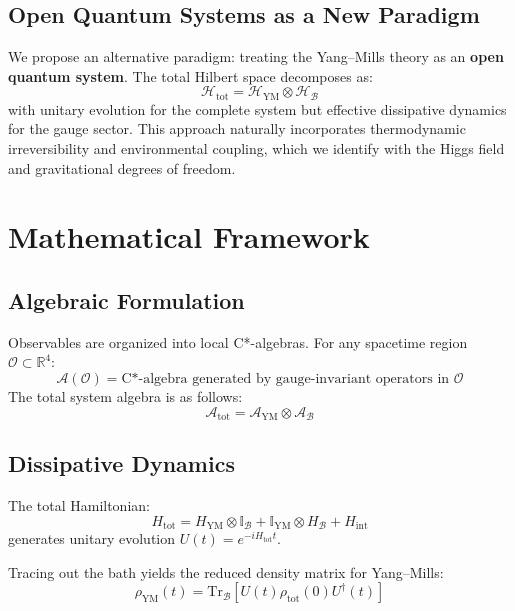\documentclass[aps,prd,reprint,superscriptaddress,floatfix]{revtex4-2}
\newcommand{\bath}{\mathcal{B}}
\newcommand{\YM}{\mathrm{YM}}
\newcommand{\hilb}{\mathscr{H}}
\newcommand{\Traza}{\mathrm{Tr}}
\begin{document}
\subsection{Open Quantum Systems as a New Paradigm}
We propose an alternative paradigm: treating the Yang--Mills theory as an \textbf{open quantum system}. The total Hilbert space decomposes as:
\begin{equation}
\hilb_{\mathrm{tot}} = \hilb_{\YM} \otimes \hilb_{\bath}
\end{equation}
with unitary evolution for the complete system but effective dissipative dynamics for the gauge sector. This approach naturally incorporates thermodynamic irreversibility and environmental coupling, which we identify with the Higgs field and gravitational degrees of freedom.

\section{Mathematical Framework}
\label{sec:math}

\subsection{Algebraic Formulation}
Observables are organized into local C*-algebras. For any spacetime region $\mathcal{O} \subset \mathbb{R}^4$:
\begin{equation}
\mathcal{A}(\mathcal{O}) = \text{C*-algebra generated by gauge-invariant operators in } \mathcal{O}
\end{equation}
The total system algebra is as follows:
\begin{equation}
\mathcal{A}_{\mathrm{tot}} = \mathcal{A}_{\YM} \otimes \mathcal{A}_{\bath}
\end{equation}

\subsection{Dissipative Dynamics}
The total Hamiltonian:
\begin{equation}
H_{\mathrm{tot}} = H_{\YM} \otimes \mathbb{I}_{\bath} + \mathbb{I}_{\YM} \otimes H_{\bath} + H_{\text{int}}
\end{equation}
generates unitary evolution $U(t) = e^{-iH_{\mathrm{tot}}t}$.

Tracing out the bath yields the reduced density matrix for Yang--Mills:
\begin{equation}
\rho_{\YM}(t) = \Traza_{\bath}[U(t)\rho_{\mathrm{tot}}(0)U^{\dagger}(t)]
\end{equation}
\end{document}
